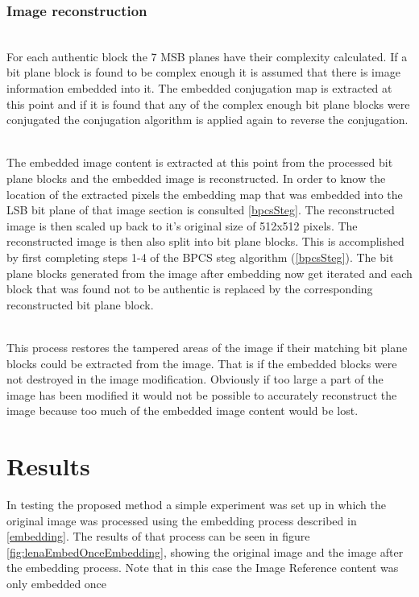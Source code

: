 \documentclass[12pt]{article}
\begin{document}
\subsubsection{Image reconstruction}
\hspace{0pt} \\
For each authentic block the 7 MSB planes have their complexity calculated.
If a bit plane block is found to be complex enough it is assumed that there is image information embedded into it.
The embedded conjugation map is extracted at this point and if it is found that any of the complex enough bit plane blocks were conjugated the conjugation algorithm is applied again to reverse the conjugation.

\hspace{0pt} \\
The embedded image content is extracted at this point from the processed bit plane blocks and the embedded image is reconstructed.
In order to know the location of the extracted pixels the embedding map that was embedded into the LSB bit plane of that image section is consulted \ref{bpcsSteg}.
The reconstructed image is then scaled up back to it's original size of 512x512 pixels.
The reconstructed image is then also split into bit plane blocks.
This is accomplished by first completing steps 1-4 of the BPCS steg algorithm (\ref{bpcsSteg}).
The bit plane blocks generated from the image after embedding now get iterated and each block that was found not to be authentic is replaced by the corresponding reconstructed bit plane block. 

\hspace{0pt} \\
This process restores the tampered areas of the image if their matching bit plane blocks could be extracted from the image. That is if the embedded blocks were not destroyed in the image modification. 
Obviously if too large a part of the image has been modified it would not be possible to accurately reconstruct the image because too much of the embedded image content would be lost.

\section{Results} 
In testing the proposed method a simple experiment was set up in which the original image was processed using the embedding process described in \ref{embedding}.
The results of that process can be seen in figure \ref{fig:lenaEmbedOnceEmbedding}, showing the original image and the image after the embedding process.
Note that in this case the Image Reference content was only embedded once
\end{document}
